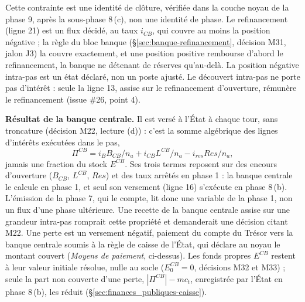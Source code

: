 \documentclass[11pt,a4paper]{article}
\begin{document}
Cette contrainte est une identité de clôture, vérifiée dans la couche noyau de la phase 9, après la sous-phase 8\,(c), non une identité de phase. Le refinancement (ligne 21) est un flux décidé, au taux $i_{\mathit{CB}}$, qui couvre au moins la position négative ; la règle du bloc banque (\S\ref{sec:banque-refinancement}, décision M31, jalon J3) la couvre exactement, et une position positive rembourse d'abord le refinancement, la banque ne détenant de réserves qu'au-delà. La position négative intra-pas est un état déclaré, non un poste ajusté. Le découvert intra-pas ne porte pas d'intérêt : seule la ligne 13, assise sur le refinancement d'ouverture, rémunère le refinancement (issue \#26, point 4).

\begin{proposee}
\textbf{Résultat de la banque centrale.} Il est versé à l'État à chaque tour, sans troncature (décision M22, lecture (d)) : c'est la somme algébrique des lignes d'intérêts exécutées dans le pas,
\begin{equation*}
\Pi^{\mathit{CB}} = i_B B_{\mathit{CB}}/n_a + i_{\mathit{CB}} L^{\mathit{CB}}/n_a - i_{\mathit{res}} \mathit{Res}/n_a ,
\end{equation*}
jamais une fraction du stock $E^{\mathit{CB}}$. Ses trois termes reposent sur des encours d'ouverture ($B_{\mathit{CB}}$, $L^{\mathit{CB}}$, $\mathit{Res}$) et des taux arrêtés en phase 1 : la banque centrale le calcule en phase 1, et seul son versement (ligne 16) s'exécute en phase 8\,(b). L'émission de la phase 7, qui le compte, lit donc une variable de la phase 1, non un flux d'une phase ultérieure. Une recette de la banque centrale assise sur une grandeur intra-pas romprait cette propriété et demanderait une décision citant M22. Une perte est un versement négatif, paiement du compte du Trésor vers la banque centrale soumis à la règle de caisse de l'État, qui déclare au noyau le montant couvert (\emph{Moyens de paiement}, ci-dessus). Les fonds propres $E^{\mathit{CB}}$ restent à leur valeur initiale résolue, nulle au socle ($E^{\mathit{CB}}_0 = 0$, décisions M32 et M33) ; seule la part non couverte d'une perte, $|\Pi^{\mathit{CB}}| - \mathit{mc}_t$, enregistrée par l'État en phase 8\,(b), les réduit (\S\ref{sec:finances_publiques-caisse}).


\end{proposee}
\end{document}
